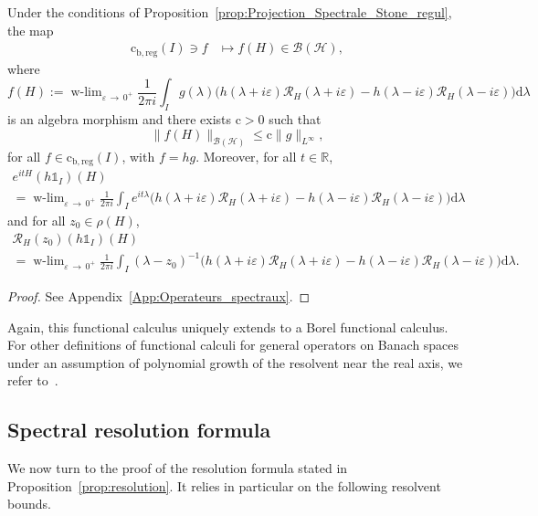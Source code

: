\documentclass[AHL,Unicode,longabstracts,published]{cedram}
\newcommand{\Hi}{\mathcal{H}}
\newcommand{\R}{\mathbb{R}}
\newcommand{\rmc}{\mathrm{c}}
\newcommand{\rmd}{\mathrm{d}}
\newcommand{\rmb}{\mathrm{b}}
\newcommand{\reg}{\mathrm{reg}}
\newcommand{\Res}{\mathcal{R}}
\newcommand{\clB}{\mathcal{B}}
\DeclareMathOperator{\wlim}{w-lim}
\newcommand{\Hi}{\mathcal{H}}
\newcommand{\R}{\mathbb{R}}
\begin{document}
\begin{prop}\label{prop:functional_calculus_reg}
Under the conditions of Proposition~\ref{prop:Projection_Spectrale_Stone_regul}, the map
\begin{align*}
\rmc_{\rmb,\reg}(I)\ni f&\mapsto f(H)\in\clB(\Hi),
\end{align*}
where
\begin{equation*}
f(H):=\wlim_{\varepsilon\,\rightarrow\,0^+}\frac{1}{2\pi i}\int_Ig(\lambda)\big(h(\lambda+i\varepsilon)\Res_{H}(\lambda+i\varepsilon)-h(\lambda-i\varepsilon)\Res_{H}(\lambda-i\varepsilon)\big)\rmd \lambda
\end{equation*}
is an algebra morphism and there exists $\rmc>0$ such that
\begin{equation}\label{eq:algebra_morph_regul}
\|f(H)\|_{\clB(\Hi)} \le \rmc \|g\|_{L^\infty},
\end{equation}
for all $f \in \rmc_{\rmb,\reg}(I)$, with $f=hg$. Moreover, for all $t\in\R$,
\begin{multline}\label{eq:Projection_spectral_calcul_fonctionnel_semi-group_regul}
e^{itH}(h\mathds{1}_I)(H)\\
=\wlim_{\varepsilon\,\rightarrow\,0^+}\frac{1}{2\pi i}\int_I e^{it\lambda}\big(h(\lambda+i\varepsilon)\Res_H(\lambda+i\varepsilon)-h(\lambda-i\varepsilon)\Res_H(\lambda-i\varepsilon)\big)\rmd \lambda
\end{multline}
and for all $z_0\in\rho(H)$,
\begin{multline}\label{eq:Projection_spectral_calcul_fonctionnel_resolvent_regul}
\Res_H(z_0)(h\mathds{1}_I)(H)\\
=\wlim_{\varepsilon\,\rightarrow\,0^+}\frac{1}{2\pi i}\int_I (\lambda-z_0)^{-1} \big(h(\lambda+i\varepsilon)\Res_H(\lambda+i\varepsilon)-h(\lambda-i\varepsilon)\Res_H(\lambda-i\varepsilon)\big)\rmd \lambda.
\end{multline}
\end{prop}


\begin{proof}
See Appendix~\ref{App:Operateurs_spectraux}.
\end{proof}

Again, this functional calculus uniquely extends to a Borel functional calculus. For other definitions of functional calculi for general operators on Banach spaces under an assumption of polynomial growth of the resolvent near the real axis, we refer to~\cite{Da95_01,GeGeHa13_01}.

\subsection{Spectral resolution formula}\label{subsec:spectr_res}
We now turn to the proof of the resolution formula stated in Proposition~\ref{prop:resolution}. It relies in particular on the following resolvent bounds.
\end{document}
